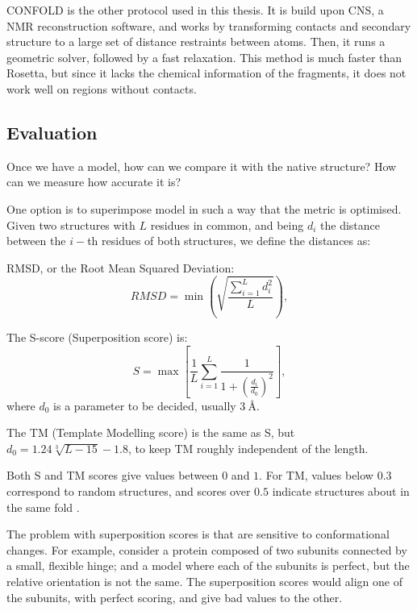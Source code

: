 CONFOLD \citep{confold}  is the other protocol used in this thesis.
It is build upon CNS, a NMR reconstruction software, and works by transforming contacts and secondary structure to a large set of distance restraints between atoms.
Then, it runs a geometric solver, followed by a fast relaxation.
This method is much faster than Rosetta, but since it lacks the chemical information of the fragments, it does not work well on regions without contacts.


\subsection{Evaluation}
Once we have a model, how can we compare it with the native structure? How can we measure how accurate it is?

One option is to superimpose model 
in such a way that the metric is optimised.
Given two structures with $L$ residues in common, and being $d_i$ the distance between the $i-$th residues of both structures, we define the distances as:

RMSD, or the Root Mean Squared Deviation:
\begin{equation*}
RMSD = \min \left(\sqrt{\frac{\sum_{i=1}^L d_i^2}{L}}\right),
\end{equation*}

The S-score (Superposition score) is:
\begin{equation*}
S = \max\left[\frac{1}{L} \sum_{i=1}^L \frac{1}{1 + \left(\frac{d_i}{d_0}\right)^2}\right],
\end{equation*}
where $d_0$ is a parameter to be decided, usually $\SI{3}{\angstrom}$.

The TM (Template Modelling score) is the same as S, but $d_0 = 1.24 \sqrt[3]{L - 15} - 1.8$, to keep TM roughly independent of the length.

Both S and TM scores give values between $0$ and $1$.
For TM, values below $0.3$ correspond to random structures, and scores over $0.5$ indicate structures about in the same fold \citep{tmscore05}.

The problem with superposition scores is that are sensitive to conformational changes.
For example, consider a protein composed of two subunits connected by a small, flexible hinge; and a model where each of the subunits is perfect, but the relative orientation is not the same.
The superposition scores would align one of the subunits, with perfect scoring, and give bad values to the other.

